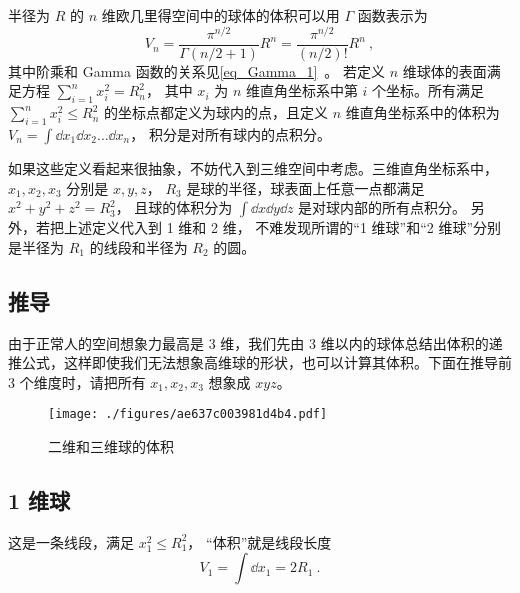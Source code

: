 
半径为 $R$ 的 $n$ 维欧几里得空间中的球体的体积可以用 $\Gamma$ 函数表示为
\begin{equation}\label{eq_NSphV_8}
V_n = \frac{\pi^{n/2}}{\Gamma (n/2+1)} R^n = \frac{\pi^{n/2}}{(n/2)!} R^n~,
\end{equation}
其中阶乘和 Gamma 函数的关系见\autoref{eq_Gamma_1}~。 若定义 $n$ 维球体的表面满足方程 $\sum_{i=1}^n x_i^2 = R_n^2$， 其中 $x_i$ 为 $n$ 维直角坐标系中第 $i$ 个坐标。所有满足 $\sum_{i=1}^n x_i^2 \leqslant R_n^2$ 的坐标点都定义为球内的点，且定义 $n$ 维直角坐标系中的体积为 $V_n = \int \dd{x_1}\dd{x_2}\dots\dd{x_n}$， 积分是对所有球内的点积分。

如果这些定义看起来很抽象，不妨代入到三维空间中考虑。三维直角坐标系中， $x_1, x_2, x_3$ 分别是 $x,y,z$，  $R_3$ 是球的半径，球表面上任意一点都满足 $x^2 + y^2 + z^2 = R_3^2$， 且球的体积分为 $\int \dd{x}\dd{y}\dd{z}$ 是对球内部的所有点积分。 另外，若把上述定义代入到 1 维和 2 维， 不难发现所谓的“1 维球”和“2 维球”分别是半径为 $R_1$ 的线段和半径为 $R_2$ 的圆。

\subsection{推导}
由于正常人的空间想象力最高是 3 维，我们先由 3 维以内的球体总结出体积的递推公式，这样即使我们无法想象高维球的形状，也可以计算其体积。下面在推导前 3 个维度时，请把所有 $x_1, x_2, x_3$ 想象成 $xyz$。 
\begin{figure}[ht]
\centering
\texttt{[image: ./figures/ae637c003981d4b4.pdf]}
\caption{二维和三维球的体积} \label{fig_NSphV_1}
\end{figure}
\subsection{1 维球}
这是一条线段，满足 $x_1^2 \leqslant R_1^2$， “体积”就是线段长度
\begin{equation}\label{eq_NSphV_1}
V_1 = \int \dd{x_1} = 2 R_1~.
\end{equation}
